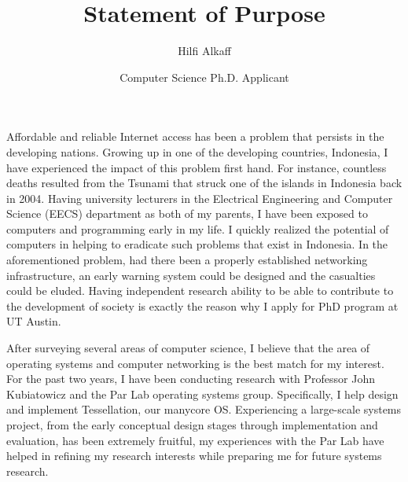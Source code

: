 \documentclass[12pt]{article}
\title{Statement of Purpose}
\author{Hilfi Alkaff}
\date{Computer Science Ph.D. Applicant}
\begin{document}
  \maketitle%

Affordable and reliable Internet access has been a problem that persists in the developing nations. Growing up in one of the developing countries, Indonesia, I have experienced the impact of this problem first hand. For instance, countless deaths resulted from the Tsunami that struck one of the islands in Indonesia back in 2004. Having university lecturers in the Electrical Engineering and Computer Science (EECS) department as both of my parents, I have been exposed to computers and programming early in my life. I quickly realized the potential of computers in helping to eradicate such problems that exist in Indonesia. In the aforementioned problem, had there been a properly established networking infrastructure, an early warning system could be designed and the casualties could be eluded. Having independent research ability to be able to contribute to the development of society is exactly the reason why I apply for PhD program at UT Austin. \newline


After surveying several areas of computer science, I believe that the area of operating systems and computer networking is the best match for my interest. For the past two years, I have been conducting research with Professor John Kubiatowicz and the Par Lab operating systems group. Specifically, I help design and implement Tessellation, our manycore OS. Experiencing a large-scale systems project, from the early conceptual design stages through implementation and evaluation, has been extremely fruitful, my experiences with the Par Lab have helped in refining my research interests while preparing me for future systems research. \newline
\end{document}
